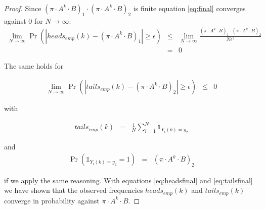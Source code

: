 \documentclass[a4paper, 12pt, titlepage]{article}
\begin{document}
\begin{proof}
Since $(\pi \cdot A^k \cdot B)_1\cdot (\pi \cdot A^k \cdot B)_2$ is finite equation \eqref{eq:final} converges against $0$ for $N\rightarrow \infty$:
\begin{eqnarray}
	\lim_{N\rightarrow \infty} \Pr(\left | heads_{emp}(k) - (\pi \cdot A^k \cdot B)_1 \right | \ge \epsilon ) &\le& \lim_{N\rightarrow \infty} \frac{(\pi \cdot A^k \cdot B)_1\cdot (\pi \cdot A^k \cdot B)_2}{N\epsilon^2} \nonumber \\
	&=& 0 \label{eq:headsfinal}
\end{eqnarray}

The same holds for

\begin{eqnarray}
	\lim_{N\rightarrow \infty} \Pr(\left | tails_{emp}(k) - (\pi \cdot A^k \cdot B)_2 \right | \ge \epsilon ) &\le& 0 \label{eq:tailsfinal}
\end{eqnarray}

with

\begin{eqnarray*}
	tails_{emp}(k) &=& \frac{1}{N}\sum_{i=1}^N \mathds{1}_{Y_i(k)=y_2}
\end{eqnarray*}

and
\begin{eqnarray*}
	\Pr(\mathds{1}_{Y_i(k)=y_2}=1) &=& (\pi \cdot A^k \cdot B)_2
\end{eqnarray*}

if we apply the same reasoning.
With equations \eqref{eq:headsfinal} and \eqref{eq:tailsfinal} we have shown that the observed frequencies $heads_{emp}(k)$ and $tails_{emp}(k)$ converge in probability against $\pi \cdot A^k \cdot B$.

\end{proof}
\end{document}
